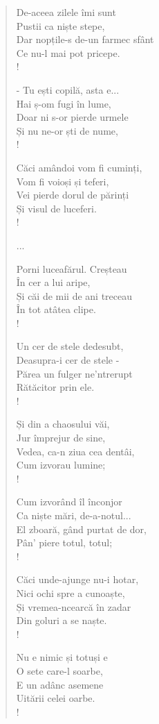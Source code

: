\documentclass{article}
\begin{document}
\begin{small}
\begin{multicols}{3}
\begin{verse}
De-aceea zilele îmi sunt \\
Pustii ca niște stepe, \\
Dar nopțile-s de-un farmec sfânt \\
Ce nu-l mai pot pricepe. \\!

- Tu ești copilă, asta e... \\
Hai ș-om fugi în lume, \\
Doar ni s-or pierde urmele \\
Și nu ne-or ști de nume, \\!

Căci amândoi vom fi cuminți, \\
Vom fi voioși și teferi, \\
Vei pierde dorul de părinți \\
Și visul de luceferi. \\!

...

Porni luceafărul. Creșteau \\
În cer a lui aripe, \\
Și căi de mii de ani treceau \\
În tot atâtea clipe. \\!

Un cer de stele dedesubt, \\
Deasupra-i cer de stele - \\
Părea un fulger ne'ntrerupt \\
Rătăcitor prin ele. \\!

Și din a chaosului văi, \\
Jur împrejur de sine, \\
Vedea, ca-n ziua cea dentâi, \\
Cum izvorau lumine; \\!

Cum izvorând îl înconjor \\
Ca niște mări, de-a-notul... \\
El zboară, gând purtat de dor, \\
Pân' piere totul, totul; \\!

Căci unde-ajunge nu-i hotar, \\
Nici ochi spre a cunoaște, \\
Și vremea-ncearcă în zadar \\
Din goluri a se naște. \\!

Nu e nimic și totuși e \\
O sete care-l soarbe, \\
E un adânc asemene \\
Uitării celei oarbe. \\!


\end{verse}
\end{multicols}
\end{small}
\end{document}
